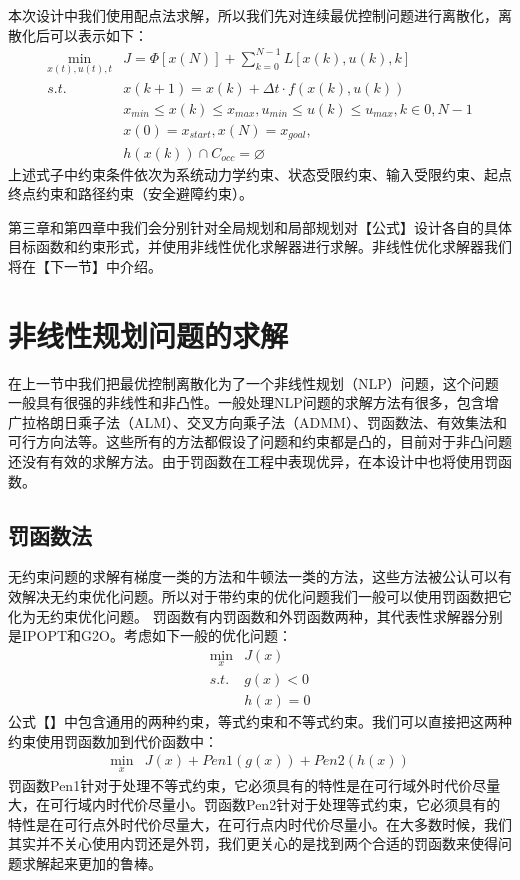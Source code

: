 \documentclass[master,academic]{ysuthesis} %
\begin{document}
	本次设计中我们使用配点法求解，所以我们先对连续最优控制问题进行离散化，离散化后可以表示如下：
	\begin{equation}
	\begin{aligned}
		\min_{x(t),u(t),t} &J = \Phi[x(N)]+\sum_{k=0}^{N-1}L[x(k),u(k),k]\\
			s.t. \ \ \ &x(k+1) = x(k)+ \Delta t \cdot f(x(k),u(k))\\
			&x_{min}\le x(k) \le x_{max},u_{min}\le u(k) \le u_{max},k \in{0,N-1}\\
			&x(0)=x_{start},x(N)=x_{goal},\\
			&h(x(k))\cap C_{occ}=\varnothing 
	\end{aligned}
	\end{equation}
	上述式子中约束条件依次为系统动力学约束、状态受限约束、输入受限约束、起点终点约束和路径约束（安全避障约束）。

	第三章和第四章中我们会分别针对全局规划和局部规划对【公式】设计各自的具体目标函数和约束形式，并使用非线性优化求解器进行求解。非线性优化求解器我们将在【下一节】中介绍。

	\section{非线性规划问题的求解}
	在上一节中我们把最优控制离散化为了一个非线性规划（NLP）问题，这个问题一般具有很强的非线性和非凸性。一般处理NLP问题的求解方法有很多，包含增广拉格朗日乘子法（ALM）、交叉方向乘子法（ADMM）、罚函数法、有效集法和可行方向法等。这些所有的方法都假设了问题和约束都是凸的，目前对于非凸问题还没有有效的求解方法。由于罚函数在工程中表现优异，在本设计中也将使用罚函数。
		\subsection{罚函数法}
		无约束问题的求解有梯度一类的方法和牛顿法一类的方法，这些方法被公认可以有效解决无约束优化问题。所以对于带约束的优化问题我们一般可以使用罚函数把它化为无约束优化问题。
		罚函数有内罚函数和外罚函数两种，其代表性求解器分别是IPOPT和G2O。考虑如下一般的优化问题：
		\begin{equation}
			\begin{aligned}
				\min_{x} &J(x)\\
					s.t. &g(x)<0\\
					&h(x)=0
			\end{aligned}
		\end{equation}
		公式【】中包含通用的两种约束，等式约束和不等式约束。我们可以直接把这两种约束使用罚函数加到代价函数中：
		\begin{equation}
			\begin{aligned}
				\min_{x} &J(x)+Pen1(g(x))+Pen2(h(x))
			\end{aligned}
		\end{equation}
		罚函数Pen1针对于处理不等式约束，它必须具有的特性是在可行域外时代价尽量大，在可行域内时代价尽量小。罚函数Pen2针对于处理等式约束，它必须具有的特性是在可行点外时代价尽量大，在可行点内时代价尽量小。在大多数时候，我们其实并不关心使用内罚还是外罚，我们更关心的是找到两个合适的罚函数来使得问题求解起来更加的鲁棒。
\end{document}
